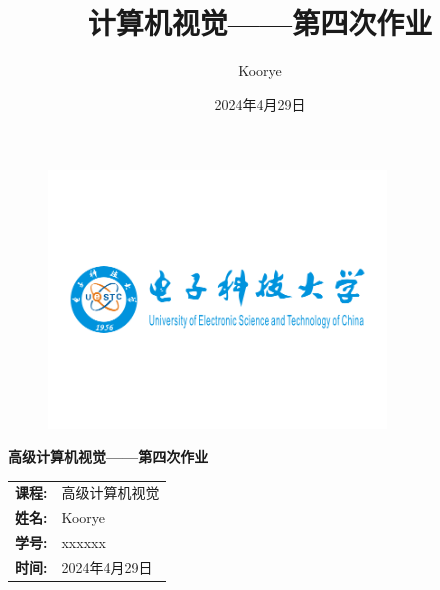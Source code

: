 \documentclass{article}
\title{计算机视觉——第四次作业}
\author{Koorye}
\date{2024年4月29日}
\begin{document}

\thispagestyle{empty}

\begin{figure}[t]
    \centering
    \includegraphics[width=0.8\textwidth]{pics/logo.png}
\end{figure}

\vspace*{\fill}
    \begin{center}
        \huge\textbf{高级计算机视觉——第四次作业}
    \end{center}
\vspace*{\fill}

\begin{table}[b]
    \centering
    \large
    \begin{tabular}{ll}
    \textbf{课程:} & 高级计算机视觉 \\
    \textbf{姓名:} & Koorye \\
    \textbf{学号:} & xxxxxx \\
    \textbf{时间:} & 2024年4月29日 \\
    \end{tabular}
\end{table}

\newpage
\tableofcontents

\newpage










\newpage

\end{document}
